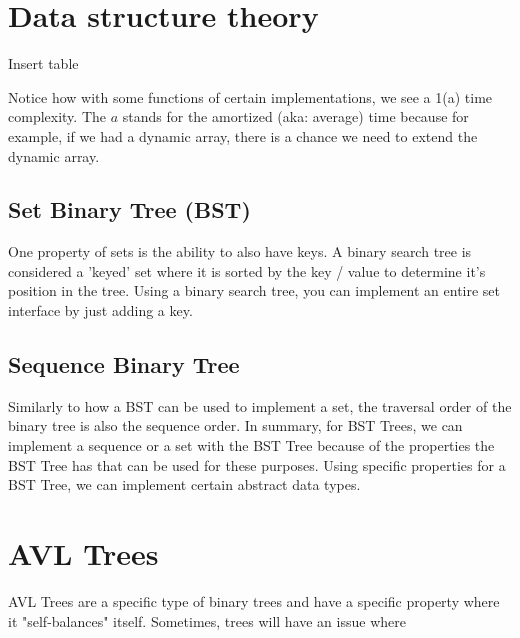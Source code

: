 \documentclass[11pt,a4paper,english]{paper}
\begin{document}
\section{Data structure theory}

Insert table


\bigskip
\noindent Notice how with some functions of certain implementations, we see a 1(a) time complexity. The $a$ stands for the amortized (aka: average) time because for example, if we had a dynamic array, there is a chance we need to extend the dynamic array.

\bigskip
\subsection{Set Binary Tree (BST)} 

One property of sets is the ability to also have keys. A binary search tree is considered a 'keyed' set where it is sorted by the key / value to determine it's position in the tree. Using a binary search tree, you can implement an entire set interface by just adding a key.

\subsection{Sequence Binary Tree}

Similarly to how a BST can be used to implement a set, the traversal order of the binary tree is also the sequence order. In summary, for BST Trees, we can implement a sequence or a set with the BST Tree because of the properties the BST Tree has that can be used for these purposes. Using specific properties for a BST Tree, we can implement certain abstract data types. 

\section{AVL Trees}

AVL Trees are a specific type of binary trees and have a specific property where it "self-balances" itself. Sometimes, trees will have an issue where 
\end{document}
